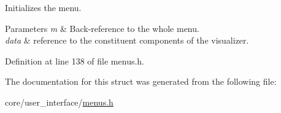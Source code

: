 Initializes the menu. 


\begin{DoxyParams}{Parameters}
{\em m} & Back-\/reference to the whole menu. \\
\hline
{\em data} & reference to the constituent components of the visualizer. \\
\hline
\end{DoxyParams}


Definition at line 138 of file menus.\+h.



The documentation for this struct was generated from the following file\+:\begin{DoxyCompactItemize}
\item 
core/user\+\_\+interface/\hyperlink{menus_8h}{menus.\+h}\end{DoxyCompactItemize}
